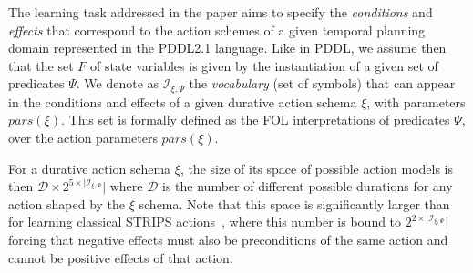 \documentclass{ecai}
\newcommand{\cond}{\mathsf{cond}}  %
\newcommand{\start}{\mathsf{start}}%
\newcommand{\en}{\mathsf{end}}     %
\newcommand{\reqs}{\mathsf{req\_{start}}} %
\newcommand{\reqe}{\mathsf{req\_{end}}}   %
\begin{document}


The learning task addressed in the paper aims to specify the {\em conditions} and {\em effects} that correspond to the action schemes of a given temporal planning domain represented in the PDDL2.1 language. Like in PDDL, we assume then that the set $F$ of state variables is given by the instantiation of a given set of predicates $\Psi$. We denote as ${\mathcal I}_{\xi,\Psi}$ the {\em vocabulary} (set of symbols) that can appear in the conditions and effects of a given durative action schema $\xi$, with parameters $pars(\xi)$. This set is formally defined as the FOL interpretations of predicates $\Psi$, over the action parameters $pars(\xi)$. 

For a durative action schema $\xi$, the size of its space of possible action models is then $\mathcal{D}\times 2^{5\times|{\mathcal I}_{\xi,\Psi}}|$ where $\mathcal{D}$ is the number of different possible durations for any action shaped by the $\xi$ schema. Note that this space is significantly larger than for learning classical STRIPS actions~\cite{yang2007learning}, where this number is bound to $2^{2\times|{\mathcal I}_{\xi,\Psi}}|$ forcing that negative effects must also be preconditions of the same action and cannot be positive effects of that action.
\end{document}
